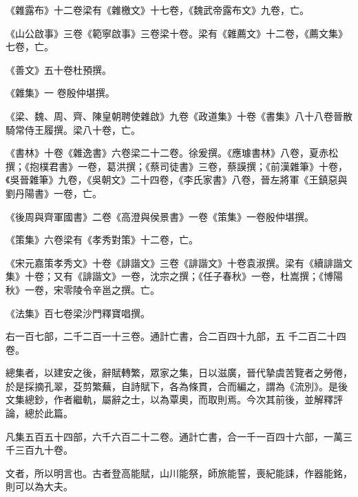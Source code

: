 \begin{pinyinscope}
 《雜露布》十二卷梁有《雜檄文》十七卷，《魏武帝露布文》九卷，亡。



 《山公啟事》三卷《範寧啟事》三卷梁十卷。梁有《雜薦文》十二卷，《薦文集》七卷，亡。



 《善文》五十卷杜預撰。



 《雜集》一
 卷殷仲堪撰。



 《梁、魏、周、齊、陳皇朝聘使雜啟》九卷《政道集》十卷《書集》八十八卷晉散騎常侍王履撰。梁八十卷，亡。



 《書林》十卷《雜逸書》六卷梁二十二卷。徐爰撰。《應璩書林》八卷，夏赤松撰；《抱樸君書》一卷，葛洪撰；《蔡司徒書》三卷，蔡謨撰；《前漢雜筆》十卷，《吳晉雜筆》九卷，《吳朝文》二十四卷，《李氏家書》八卷，晉左將軍《王鎮惡與劉丹陽書》一卷，亡。



 《後周與齊軍國書》二卷《高澄與侯景書》一卷《策集》一卷殷仲堪撰。



 《策集》六卷梁有《孝秀對策》十二卷，亡。



 《宋元嘉策孝秀文》十卷《誹諧文》三卷《誹諧文》十卷袁淑撰。梁有《續誹諧文集》十卷；又有《誹諧文》一卷，沈宗之撰；《任子春秋》一卷，杜嵩撰；《博陽秋》一卷，宋零陵令辛邕之撰。亡。



 《法集》百七卷梁沙門釋寶唱撰。



 右一百七部，二千二百一十三卷。通計亡書，合二百四十九部，五
 千二百二十四卷。



 總集者，以建安之後，辭賦轉繁，眾家之集，日以滋廣，晉代摯虞苦覽者之勞倦，於是採摘孔翠，芟剪繁蕪，自詩賦下，各為條貫，合而編之，謂為《流別》。是後文集總鈔，作者繼軌，屬辭之士，以為覃奧，而取則焉。今次其前後，並解釋評論，總於此篇。



 凡集五百五十四部，六千六百二十二卷。通計亡書，合一千一百四十六部，一萬三千三百九十卷。



 文者，所以明言也。古者登高能賦，山川能祭，師旅能誓，喪紀能誄，作器能銘，則可以為大夫。




\end{pinyinscope}
